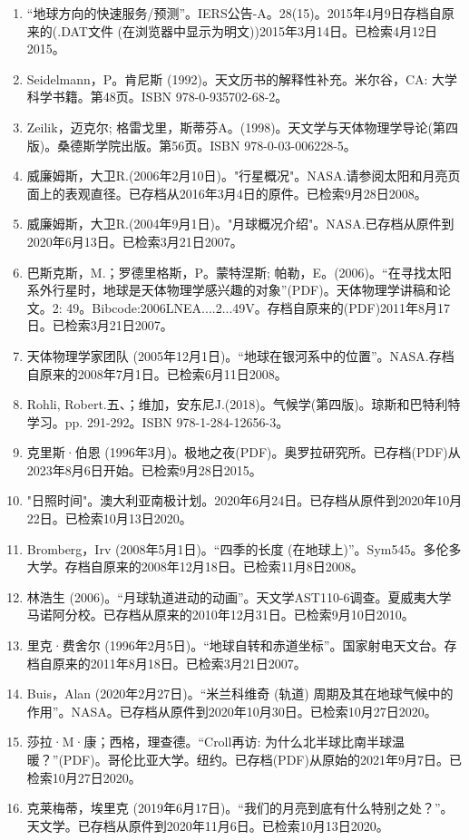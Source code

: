\begin{enumerate}
\item “地球方向的快速服务/预测”。IERS公告-A。28(15)。2015年4月9日存档自原来的(.DAT文件 (在浏览器中显示为明文))2015年3月14日。已检索4月12日2015。
\item Seidelmann，P。肯尼斯 (1992)。天文历书的解释性补充。米尔谷，CA: 大学科学书籍。第48页。ISBN 978-0-935702-68-2。
\item Zeilik，迈克尔; 格雷戈里，斯蒂芬A。(1998)。天文学与天体物理学导论(第四版)。桑德斯学院出版。第56页。ISBN 978-0-03-006228-5。
\item 威廉姆斯，大卫R.(2006年2月10日)。"行星概况"。NASA.请参阅太阳和月亮页面上的表观直径。已存档从2016年3月4日的原件。已检索9月28日2008。
\item 威廉姆斯，大卫R.(2004年9月1日)。"月球概况介绍"。NASA.已存档从原件到2020年6月13日。已检索3月21日2007。
\item 巴斯克斯，M.；罗德里格斯，P。蒙特涅斯; 帕勒，E。(2006)。“在寻找太阳系外行星时，地球是天体物理学感兴趣的对象”(PDF)。天体物理学讲稿和论文。2: 49。Bibcode:2006LNEA....2...49V。存档自原来的(PDF)2011年8月17日。已检索3月21日2007。
\item 天体物理学家团队 (2005年12月1日)。“地球在银河系中的位置”。NASA.存档自原来的2008年7月1日。已检索6月11日2008。
\item Rohli, Robert.五、；维加，安东尼J.(2018)。气候学(第四版)。琼斯和巴特利特学习。pp. 291-292。ISBN 978-1-284-12656-3。
\item 克里斯·伯恩 (1996年3月)。极地之夜(PDF)。奥罗拉研究所。已存档(PDF)从2023年8月6日开始。已检索9月28日2015。
\item "日照时间"。澳大利亚南极计划。2020年6月24日。已存档从原件到2020年10月22日。已检索10月13日2020。
\item Bromberg，Irv (2008年5月1日)。“四季的长度 (在地球上)”。Sym545。多伦多大学。存档自原来的2008年12月18日。已检索11月8日2008。
\item 林浩生 (2006)。“月球轨道进动的动画”。天文学AST110-6调查。夏威夷大学马诺阿分校。已存档从原来的2010年12月31日。已检索9月10日2010。
\item 里克·费舍尔 (1996年2月5日)。“地球自转和赤道坐标”。国家射电天文台。存档自原来的2011年8月18日。已检索3月21日2007。
\item Buis，Alan (2020年2月27日)。“米兰科维奇 (轨道) 周期及其在地球气候中的作用”。NASA。已存档从原件到2020年10月30日。已检索10月27日2020。
\item 莎拉·M·康；西格，理查德。“Croll再访: 为什么北半球比南半球温暖？”(PDF)。哥伦比亚大学。纽约。已存档(PDF)从原始的2021年9月7日。已检索10月27日2020。
\item 克莱梅蒂，埃里克 (2019年6月17日)。“我们的月亮到底有什么特别之处？”。天文学。已存档从原件到2020年11月6日。已检索10月13日2020。

\end{enumerate}
